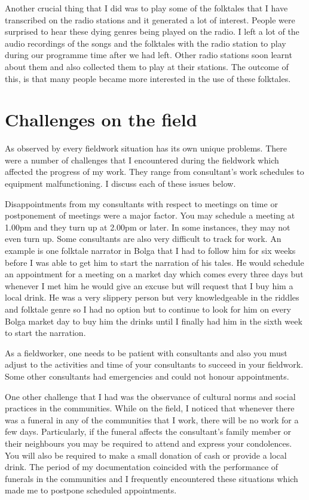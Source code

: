 \documentclass[output=paper,colorlinks,citecolor=brown]{langscibook}
\begin{document}
Another crucial thing that I did was to play some of the folktales that I have transcribed on the radio stations and it generated a lot of interest. People were surprised to hear these dying genres being played on the radio. I left a lot of the audio recordings of the songs and the folktales with the radio station to play during our programme time after we had left. Other radio stations soon learnt about them and also collected them to play at their stations. The outcome of this, is that many people became more interested in the use of these folktales.


\section{Challenges on the field}

As observed by \citet{Bowern2015} every fieldwork situation has its own unique problems. There were a number of challenges that I encountered during the fieldwork which affected the progress of my work. They range from consultant’s work schedules to equipment malfunctioning. I discuss each of these issues below.

Disappointments from my consultants with respect to meetings on time or postponement of meetings were a major factor. You may schedule a meeting at 1.00pm and they turn up at 2.00pm or later. In some instances, they may not even turn up. Some consultants are also very difficult to track for work. An example is one folktale narrator in Bolga that I had to follow him for six weeks before I was able to get him to start the narration of his tales. He would schedule an appointment for a meeting on a market day which comes every three days but whenever I met him he would give an excuse but will request that I buy him a local drink. He was a very slippery person but very knowledgeable in the riddles and folktale genre so I had no option but to continue to look for him on every Bolga market day to buy him the drinks until I finally had him in the sixth week to start the narration. 

As a fieldworker, one needs to be patient with consultants and also you must adjust to the activities and time of your consultants to succeed in your fieldwork. Some other consultants had emergencies and could not honour appointments.

One other challenge that I had was the observance of cultural norms and social practices in the communities. While on the field, I noticed that whenever there was a funeral in any of the communities that I work, there will be no work for a few days. Particularly, if the funeral affects the consultant’s family member or their neighbours you may be required to attend and express your condolences. You will also be required to make a small donation of cash or provide a local drink. The period of my documentation coincided with the performance of funerals in the communities and I frequently encountered these situations which made me to postpone scheduled appointments. 
\end{document}
